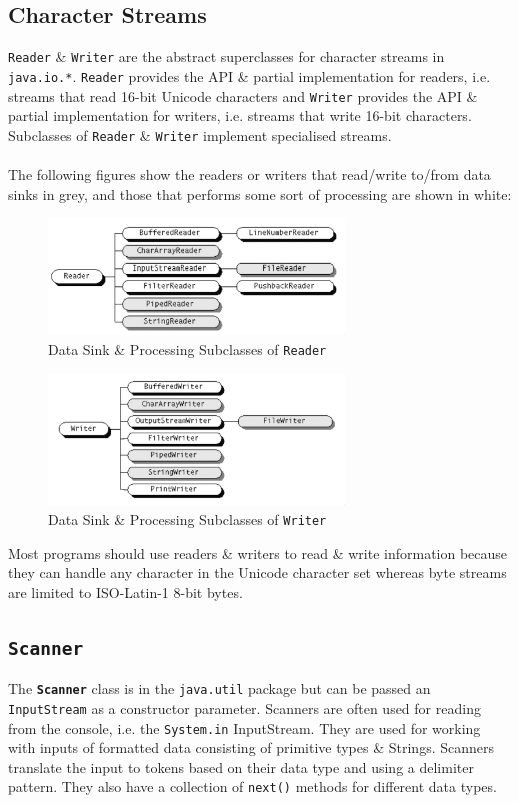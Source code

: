 \documentclass[a4paper,11pt]{article}
\begin{document}
\subsection{Character Streams}
\verb|Reader| \& \verb|Writer| are the abstract superclasses for character streams in \verb|java.io.*|. 
\verb|Reader| provides the API \& partial implementation for readers, i.e. streams that read 16-bit Unicode 
characters and \verb|Writer| provides the API \& partial implementation for writers, i.e. streams that write 
16-bit characters. 
Subclasses of \verb|Reader| \& \verb|Writer| implement specialised streams.
\\\\ 
The following figures show the readers or writers that read/write to/from data sinks in grey, and those that 
performs some sort of processing are shown in white:
\begin{figure}[H]
    \centering
    \includegraphics[width=0.7\textwidth]{./images/Reader.png}
    \caption{Data Sink \& Processing Subclasses of \texttt{Reader}}
\end{figure}
\begin{figure}[H]
    \centering
    \includegraphics[width=0.7\textwidth]{./images/Writer.png}
    \caption{Data Sink \& Processing Subclasses of \texttt{Writer}}
\end{figure}

Most programs should use readers \& writers to read \& write information because they can handle any character 
in the Unicode character set whereas byte streams are limited to ISO-Latin-1 8-bit bytes.

\subsection{\texttt{Scanner}}
The \textbf{\texttt{Scanner}} class is in the \verb|java.util| package but can be passed an \verb|InputStream| as a 
constructor parameter.
Scanners are often used for reading from the console, i.e. the \verb|System.in| InputStream.
They are used for working with inputs of formatted data consisting of primitive types \& Strings. 
Scanners translate the input to tokens based on their data type and using a delimiter pattern.
They also have a collection of \verb|next()| methods for different data types.
\end{document}
